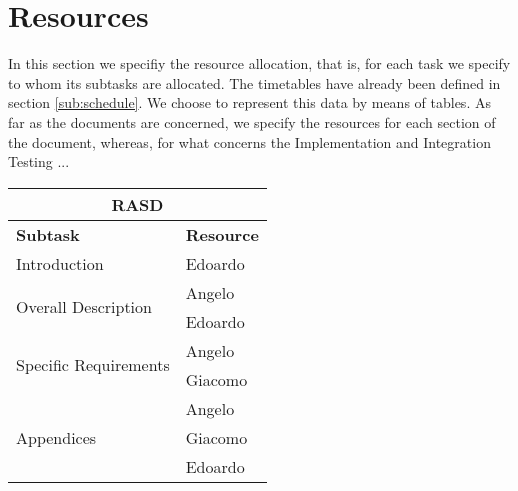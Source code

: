 \section{Resources} %
\label{sec:resources}

In this section we specifiy the resource allocation, that is, for each task we specify to whom its subtasks are allocated. The timetables have already been defined in section \ref{sub:schedule}.
We choose to represent this data by means of tables. As far as the documents are concerned, we specify the resources for each section of the document, whereas, for what concerns the Implementation and Integration Testing ...

\begin{center}
\begin{tabular}{ |l|l| }
	\multicolumn{2}{c}{\textbf{RASD}} \\ \hline
	\textbf{Subtask} & \textbf{Resource} \\ \hline
	\multirow{1}{*}{Introduction} & Edoardo \\ \hline
	\multirow{2}{*}{Overall Description} & Angelo \\
										 & Edoardo \\ \hline
	\multirow{2}{*}{Specific Requirements} & Angelo \\
										& Giacomo \\ \hline
	\multirow{3}{*}{Appendices} & Angelo \\ 
				& Giacomo \\
				& Edoardo \\ \hline

\end{tabular}
\end{center}

\vspace* {30px}


